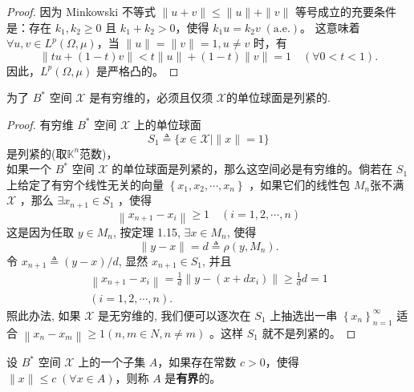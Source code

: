 \documentclass[lang=cn,newtx,10pt,scheme=chinese,thmcnt=chapter]{elegantbook}
\begin{document}
\begin{proof}
因为 Minkowski 不等式 $\|u + v\| \leqslant \|u\| + \|v\|$ 等号成立的充要条件是：存在 $k_1, k_2 \geqslant 0$ 且 $k_1 + k_2 > 0$，使得 $k_1 u = k_2 v \;(\text{a.e.})$。  
这意味着 $\forall u, v \in L^p(\Omega, \mu)$，当 $\|u\| = \|v\| = 1, u \neq v$ 时，有  
\[
\|t u + (1-t) v\| < t\|u\| + (1-t)\|v\| = 1 \quad (\forall 0 < t < 1).
\]
因此，$L^p(\Omega, \mu)$ 是严格凸的。
\end{proof}
\begin{theorem}
为了 $B^*$ 空间 $\mathscr{X}$ 是有穷维的，必须且仅须 $\mathscr{X}$的单位球面是列紧的.
\end{theorem}
\begin{proof}
有穷维 $B^*$ 空间 $\mathscr{X}$ 上的单位球面
\begin{equation*}
S_1 \triangleq\{x \in \mathscr{X} \mid\|x\|=1\}
\end{equation*}
是列紧的(取$\mathbb{K}^n$范数)，\\
如果一个 $B^*$ 空间 $\mathscr{X}$ 的单位球面是列紧的，那么这空间必是有穷维的。倘若在 $S_1$ 上给定了有穷个线性无关的向量 $\left\{x_1, x_2, \cdots, x_n\right\}$ ，如果它们的线性包 $M_n$张不满 $\mathscr{X}$ ，那么 $\exists x_{n+1} \in S_1$ ，使得
\begin{equation*}
\left\|x_{n+1}-x_i\right\| \geqslant 1 \quad(i=1,2, \cdots, n)
\end{equation*}
这是因为任取 $y \in M_n$, 按定理 1.15, $\exists x \in M_n$, 使得
\begin{equation*}
\|y-x\|=d \triangleq \rho\left(y, M_n\right) .
\end{equation*}
令 $x_{n+1} \triangleq(y-x) / d$, 显然 $x_{n+1} \in S_1$, 并且
\begin{equation*}
\begin{gathered}
\left\|x_{n+1}-x_i\right\|=\frac{1}{d}\left\|y-\left(x+d x_i\right)\right\| \geqslant \frac{1}{d} d=1 \\
(i=1,2, \cdots, n) .
\end{gathered}
\end{equation*}
照此办法, 如果 $\mathscr{X}$ 是无穷维的, 我们便可以逐次在 $S_1$ 上抽选出一串 $\left\{x_n\right\}_{n=1}^{\infty}$ 适合 $\left\|x_n-x_m\right\| \geqslant 1(n, m \in N , n \neq m)$ 。这样 $S_1$ 就不是列紧的。
\end{proof}
\begin{definition}
设 ${B}^*$ 空间 $\mathscr{X}$ 上的一个子集 $A$，如果存在常数 $c > 0$，使得 $\|x\| \leqslant c \; (\forall x \in A)$，则称 $A$ 是\textbf{有界}的。
\end{definition}
\end{document}
